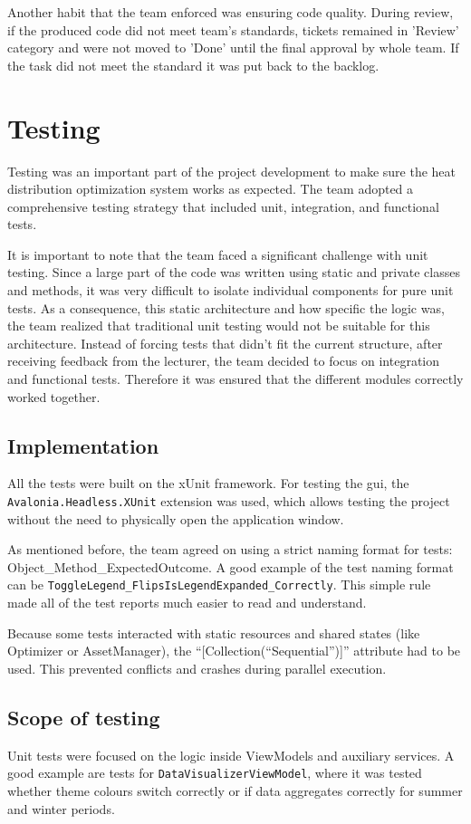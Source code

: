 Another habit that the team enforced was ensuring code quality. During review, if the produced code did not meet team’s standards, tickets remained in 'Review' category and were not moved to 'Done' until the final approval by whole team. If the task did not meet the standard it was put back to the backlog.

\section{Testing}
Testing was an important part of the project development to make sure the heat distribution optimization system works as expected. The team adopted a comprehensive testing strategy that included unit, integration, and functional tests.

It is important to note that the team faced a significant challenge with unit testing. Since a large part of the code was written using static and private classes and methods, it was very difficult to isolate individual components for pure unit tests. As a consequence, this static architecture and how specific the logic was, the team realized that traditional unit testing would not be suitable for this architecture. Instead of forcing tests that didn't fit the current structure, after receiving feedback from the lecturer, the team decided to focus on integration and functional tests. Therefore it was ensured that the different modules correctly worked together.

\subsection{Implementation}
All the tests were built on the xUnit framework. For testing the \acrshort{gui}, the \texttt{Avalonia.Head\-less.XUnit} extension was used, which allows testing the project without the need to physically open the application window.

As mentioned before, the team agreed on using a strict naming format for tests: Object\_Method\_ExpectedOutcome. A good example of the test naming format can be \texttt{ToggleLegend\_FlipsIsLegendExpanded\_Correctly}. This simple rule made all of the test reports much easier to read and understand.

Because some tests interacted with static resources and shared states (like Optimizer or AssetManager), the ``[Collection(``Sequential'')]'' attribute had to be used. This prevented conflicts and crashes during parallel execution.

\subsection{Scope of testing}
Unit tests were focused on the logic inside ViewModels and auxiliary services. A good example are tests for \texttt{DataVisualizerViewModel}, where it was tested whether theme colours switch correctly or if data aggregates correctly for summer and winter periods.

